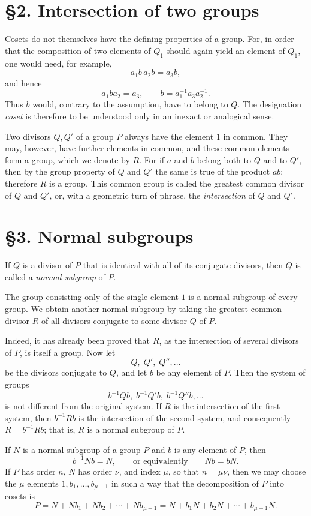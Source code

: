 \documentclass[11pt,a4paper]{book}
\begin{document}
\section*{§2. Intersection of two groups}
Cosets do not themselves have the defining properties of a group. For, in order that the composition of two elements of $Q_1$ should again yield an element of $Q_1$, one would need, for example,
\[
 a_1 b\, a_2 b = a_3 b,
\]
and hence
\[
 a_1 b a_2 = a_3,
 \qquad
 b = a_1^{-1} a_3 a_2^{-1}.
\]
Thus $b$ would, contrary to the assumption, have to belong to $Q$. The designation \emph{coset} is therefore to be understood only in an inexact or analogical sense.

Two divisors $Q,Q'$ of a group $P$ always have the element $1$ in common. They may, however, have further elements in common, and these common elements form a group, which we denote by $R$. For if $a$ and $b$ belong both to $Q$ and to $Q'$, then by the group property of $Q$ and $Q'$ the same is true of the product $ab$; therefore $R$ is a group. This common group is called the greatest common divisor of $Q$ and $Q'$, or, with a geometric turn of phrase, the \emph{intersection} of $Q$ and $Q'$.

\section*{§3. Normal subgroups}
If $Q$ is a divisor of $P$ that is identical with all of its conjugate divisors, then $Q$ is called a \emph{normal subgroup} of $P$.

The group consisting only of the single element $1$ is a normal subgroup of every group. We obtain another normal subgroup by taking the greatest common divisor $R$ of all divisors conjugate to some divisor $Q$ of $P$.

Indeed, it has already been proved that $R$, as the intersection of several divisors of $P$, is itself a group. Now let
\[
 Q,\;Q',\;Q'',\dots
\]
be the divisors conjugate to $Q$, and let $b$ be any element of $P$. Then the system of groups
\[
 b^{-1}Qb,\; b^{-1}Q'b,\; b^{-1}Q''b,\dots
\]
is not different from the original system. If $R$ is the intersection of the first system, then $b^{-1}Rb$ is the intersection of the second system, and consequently $R=b^{-1}Rb$; that is, $R$ is a normal subgroup of $P$.

If $N$ is a normal subgroup of a group $P$ and $b$ is any element of $P$, then
\[
 b^{-1} N b = N,
 \qquad\text{or equivalently}\qquad
 N b = b N.
\]
If $P$ has order $n$, $N$ has order $\nu$, and index $\mu$, so that $n=\mu\nu$, then we may choose the $\mu$ elements $1,b_1,\dots,b_{\mu-1}$ in such a way that the decomposition of $P$ into cosets is
\[
 P = N + N b_1 + N b_2 + \cdots + N b_{\mu-1}
   = N + b_1 N + b_2 N + \cdots + b_{\mu-1} N.
\]
\end{document}
